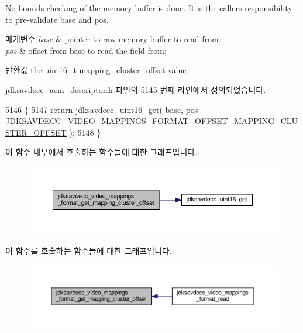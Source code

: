 No bounds checking of the memory buffer is done. It is the caller\textquotesingle{}s responsibility to pre-\/validate base and pos.


\begin{DoxyParams}{매개변수}
{\em base} & pointer to raw memory buffer to read from. \\
\hline
{\em pos} & offset from base to read the field from; \\
\hline
\end{DoxyParams}
\begin{DoxyReturn}{반환값}
the uint16\+\_\+t mapping\+\_\+cluster\+\_\+offset value 
\end{DoxyReturn}


jdksavdecc\+\_\+aem\+\_\+descriptor.\+h 파일의 5145 번째 라인에서 정의되었습니다.


\begin{DoxyCode}
5146 \{
5147     \textcolor{keywordflow}{return} \hyperlink{group__endian_ga3fbbbc20be954aa61e039872965b0dc9}{jdksavdecc\_uint16\_get}( base, pos + 
      \hyperlink{group__video__mappings__format_ga82875713f9269add7ed6c5b2b920805a}{JDKSAVDECC\_VIDEO\_MAPPINGS\_FORMAT\_OFFSET\_MAPPING\_CLUSTER\_OFFSET}
       );
5148 \}
\end{DoxyCode}


이 함수 내부에서 호출하는 함수들에 대한 그래프입니다.\+:
\nopagebreak
\begin{figure}[H]
\begin{center}
\leavevmode
\includegraphics[width=350pt]{group__video__mappings__format_ga8966b74539a03c52127060ffbb15febf_cgraph}
\end{center}
\end{figure}




이 함수를 호출하는 함수들에 대한 그래프입니다.\+:
\nopagebreak
\begin{figure}[H]
\begin{center}
\leavevmode
\includegraphics[width=350pt]{group__video__mappings__format_ga8966b74539a03c52127060ffbb15febf_icgraph}
\end{center}
\end{figure}


